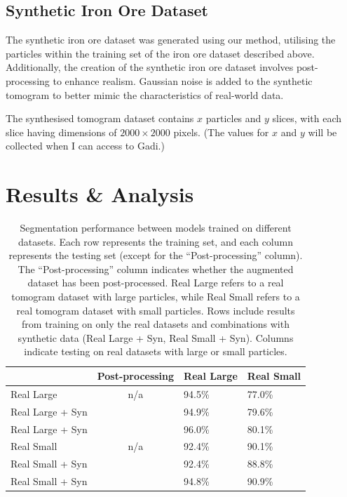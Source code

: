 \documentclass[preprint,12pt]{elsarticle}
\newcommand{\cmark}{\ding{51}}%
\newcommand{\xmark}{\ding{55}}%
\begin{document}
\subsection{Synthetic Iron Ore Dataset}
The synthetic iron ore dataset was generated using our method, utilising the particles within the training set of the iron ore dataset described above. 
Additionally, the creation of the synthetic iron ore dataset involves post-processing to enhance realism. 
Gaussian noise is added to the synthetic tomogram to better mimic the characteristics of real-world data.
\par
The synthesised tomogram dataset contains $x$ particles and $y$ slices, with each slice having dimensions of $2000 \times 2000$ pixels. (The values for $x$ and $y$ will be collected when I can access to Gadi.) 
\section{Results \& Analysis}
\begin{table}[]
    \center
    \begin{tabular}{|l|c|l|l|}
        \hline
                               & Post-processing & Real Large & Real Small \\ \hline
        Real Large             & n/a    & 94.5\%     & 77.0\%     \\ \hline
        Real Large + Syn       & \xmark & 94.9\%     & 79.6\%     \\ \hline
        Real Large + Syn       & \cmark & 96.0\%     & 80.1\%     \\ \hline \hline
        Real Small             & n/a    & 92.4\%     & 90.1\%     \\ \hline
        Real Small + Syn       & \xmark & 92.4\%     & 88.8\%     \\ \hline
        Real Small + Syn       & \cmark & 94.8\%     & 90.9\%     \\ \hline
    \end{tabular}
    \caption{Segmentation performance between models trained on different datasets. 
    Each row represents the training set, and each column represents the testing set (except for the ``Post-processing'' column). 
    The ``Post-processing'' column indicates whether the augmented dataset has been post-processed.
    Real Large refers to a real tomogram dataset with large particles, while Real Small refers to a real tomogram dataset with small particles. 
    Rows include results from training on only the real datasets and combinations with synthetic data (Real Large + Syn, Real Small + Syn). 
    Columns indicate testing on real datasets with large or small particles.
    }
    \label{tab:res1}
\end{table}
\end{document}
